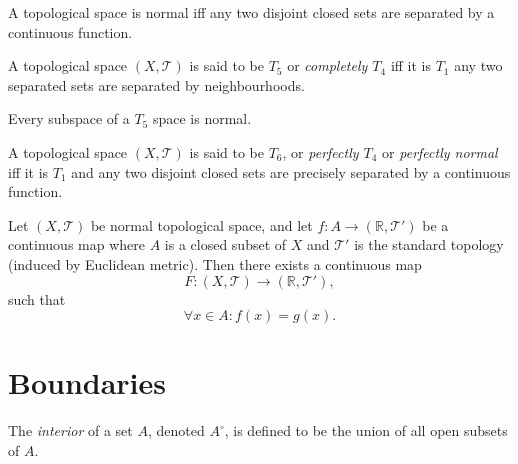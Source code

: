 \begin{proposition}
	\label{prop: urysohn's lemma}
	A topological space is normal iff any two disjoint closed sets are separated by a continuous function.
\end{proposition}


\begin{definition}
	[$T_5$ spaces]
	\label{def: T_5 spaces}
	A topological space $(X, \mathcal T)$ is said to be $T_5$ or \textit{completely $T_4$} iff it is $T_1$ any two separated sets are separated by neighbourhoods.
\end{definition}


\begin{proposition}
	Every subspace of a $T_5$ space is normal.
\end{proposition}


\begin{definition}
	[$T_6$ spaces]
	\label{def: T_6 spaces}
	A topological space $(X, \mathcal T)$ is said to be $T_6$, or \textit{perfectly $T_4$} or \textit{perfectly normal} iff it is $T_1$ and any two disjoint closed sets are precisely separated by a continuous function.
\end{definition}



\begin{proposition}
	\label{prop: Tietze extension theorem}
	Let $(X, \mathcal T)$ be normal topological space, and let $f: A \to (\mathbb R, \mathcal T')$ be a continuous map where $A$ is a closed subset of $X$ and $\mathcal T'$ is the standard topology (induced by Euclidean metric). Then there exists a continuous map
	$$
	F: (X, \mathcal T) \to (\mathbb R, \mathcal T'),
	$$
	such that
	$$
	\forall x \in A: f(x) = g(x).
	$$
\end{proposition}


\section{Boundaries}


\begin{definition}
	[interiors]
	\label{def: interiors}
	The \textit{interior} of a set $A$, denoted $A^\circ$, is defined to be the union of all open subsets of $A$.
\end{definition}


